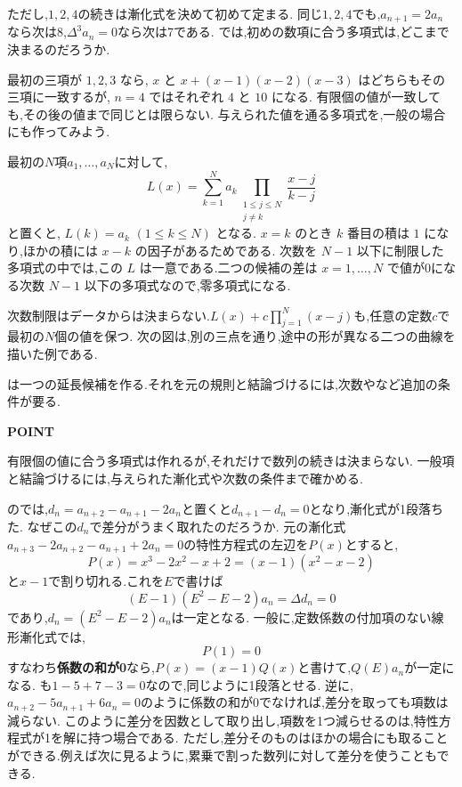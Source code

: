 ただし,$1,2,4$の続きは漸化式を決めて初めて定まる.
同じ$1,2,4$でも,$a_{n+1}=2a_n$なら次は8,$\Delta^3a_n=0$なら次は7である.
では,初めの数項に合う多項式は,どこまで決まるのだろうか.

\label{節：有限個の点から多項式を作る}
最初の三項が $1,2,3$ なら,
$x$ と $x+(x-1)(x-2)(x-3)$ はどちらもその三項に一致するが,
$n=4$ ではそれぞれ $4$ と $10$ になる.
有限個の値が一致しても,その後の値まで同じとは限らない.
与えられた値を通る多項式を,一般の場合にも作ってみよう.

最初の$N$項$a_1,\ldots,a_N$に対して,
\[
  L(x)=\sum_{k=1}^{N}a_k
  \prod_{\substack{1\le j\le N\\j\ne k}}
  \frac{x-j}{k-j}
\]
と置くと, $L(k)=a_k$ $(1\le k\le N)$ となる.
$x=k$ のとき $k$ 番目の積は $1$ になり,ほかの積には $x-k$ の因子があるためである.
次数を $N-1$ 以下に制限した多項式の中では,この $L$ は一意である.二つの候補の差は $x=1,\ldots,N$ で値が0になる次数 $N-1$ 以下の多項式なので,零多項式になる.

次数制限はデータからは決まらない.$L(x)+c\prod_{j=1}^{N}(x-j)$も,任意の定数$c$で最初の$N$個の値を保つ.
次の図は,別の三点を通り,途中の形が異なる二つの曲線を描いた例である.
\BookFigLagrange

は一つの延長候補を作る.それを元の規則と結論づけるには,次数やなど追加の条件が要る.

\begin{bookpoint}
  \textbf{POINT}\par
  有限個の値に合う多項式は作れるが,それだけで数列の続きは決まらない.
  一般項と結論づけるには,与えられた漸化式や次数の条件まで確かめる.
\end{bookpoint}

のでは,$d_n=a_{n+2}-a_{n+1}-2a_n$と置くと$d_{n+1}-d_n=0$となり,漸化式が1段落ちた.
なぜこの$d_n$で差分がうまく取れたのだろうか.
元の漸化式$a_{n+3}-2a_{n+2}-a_{n+1}+2a_n=0$の特性方程式の左辺を$P(x)$とすると,
\[
  P(x)=x^3-2x^2-x+2=(x-1)(x^2-x-2)
\]
と$x-1$で割り切れる.これを$E$で書けば
\[
  (E-1)(E^2-E-2)a_n=\Delta d_n=0
\]
であり,$d_n=(E^2-E-2)a_n$は一定となる.
一般に,定数係数の付加項のない線形漸化式では,
\[
  P(1)=0
\]
すなわち\textbf{係数の和が0}なら,$P(x)=(x-1)Q(x)$と書けて,$Q(E)a_n$が一定になる.
も$1-5+7-3=0$なので,同じように1段落とせる.
逆に,$a_{n+2}-5a_{n+1}+6a_n=0$のように係数の和が0でなければ,差分を取っても項数は減らない.
このように差分を因数として取り出し,項数を1つ減らせるのは,特性方程式が1を解に持つ場合である.
ただし,差分そのものはほかの場合にも取ることができる.例えば次に見るように,累乗で割った数列に対して差分を使うこともできる.

